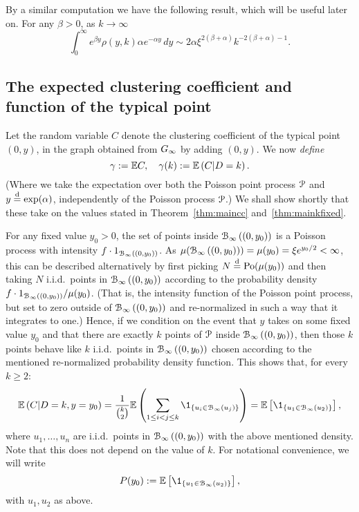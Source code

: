 By a similar computation we have the following result, which will be useful later on. For any $\beta > 0$, as $k \to \infty$
\begin{equation}\label{eq:general_integral_rho_y_k}
	\int_0^\infty e^{\beta y} \rho(y, k) \alpha e^{-\alpha y} \, dy
    \sim 2\alpha \xi^{2(\beta + \alpha)} k^{-2(\beta + \alpha)-1}.
\end{equation}


\subsection{The expected clustering coefficient and function of the typical point}


Let the random variable $C$ denote the clustering coefficient of the typical point $(0,y)$, in the graph obtained from $G_{\infty}$ by adding $(0,y)$. We now {\em define}
\[
	\gamma := {\mathbb E} C, \quad \gamma(k) := {\mathbb E}\left( C | D = k \right).
\]
(Where we take the expectation over both the Poisson point process ${\mathcal P}$ and $y \stackrel{\text{d}}{=} \text{exp}(\alpha)$, independently of the Poisson process ${\mathcal P}$.) We shall show shortly that these take on the values stated in Theorem~\ref{thm:maincc} and~\ref{thm:mainkfixed}.


For any fixed value $y_0>0$, the set of points inside ${\mathcal B}_{\infty}\left((0,y_0)\right)$ is a Poisson process with intensity $f \cdot 1_{{\mathcal B}_{\infty}\left((0,y_0)\right)}$. As $\mu({\mathcal B}_{\infty}\left((0,y_0)\right)) = \mu(y_0) = \xi e^{y_0/2} < \infty$, this can be described alternatively by first picking $N \stackrel{\text{d}}{=} {\mathrm{Po}}( \mu(y_0) )$ and then taking $N$ i.i.d.~points in ${\mathcal B}_{\infty}\left((0,y_0)\right)$ according to the probability density $f \cdot 1_{{\mathcal B}_{\infty}\left((0,y_0)\right)} / \mu(y_0)$. (That is, the intensity function of the Poisson point process, but set to zero outside of ${\mathcal B}_{\infty}\left((0,y_0)\right)$ and re-normalized in such a way that it integrates to one.) Hence, if we condition on the event that $y$ takes on some fixed value $y_0$ and that there are exactly $k$ points of ${\mathcal P}$ inside ${\mathcal B}_{\infty}\left((0,y_0)\right)$, then those $k$ points behave like $k$ i.i.d.~points in ${\mathcal B}_{\infty}\left((0,y_0)\right)$ chosen according to the mentioned re-normalized probability density function. This shows that, for every $k\geq 2$:
\[
	\Ee\left( C | D=k, y=y_0 \right) 
	= \frac{1}{{k\choose 2}} \Ee\left( \sum_{1\leq i < j \leq k} \1_{\{u_i\in \BallPo{u_j}\}} \right)
	= \Exp{\1_{\{u_1\in\BallPo{u_2}\}}},
\]
where $u_1,\dots, u_n$ are i.i.d.~points in ${\mathcal B}_{\infty}\left((0,y_0)\right)$ with the above mentioned density.
Note that this does not depend on the value of $k$. For notational convenience, we will write 
\[ 
	P(y_0) := \Exp{\1_{\{u_1\in\BallPo{u_2}\}}},
\]
with $u_1, u_2$ as above.

